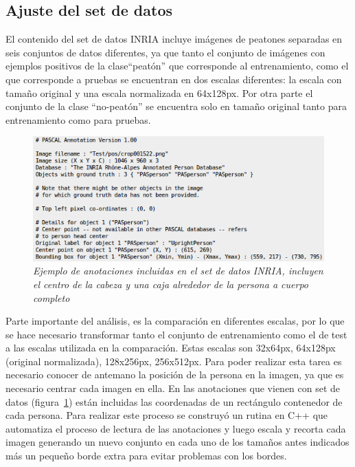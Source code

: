 \subsection{Ajuste del set de datos}

El contenido del set de datos INRIA incluye imágenes de peatones separadas en seis conjuntos de datos diferentes, ya que tanto el conjunto de imágenes con ejemplos positivos de la clase``peatón'' que corresponde al entrenamiento, como el que corresponde a pruebas se encuentran en dos escalas diferentes: la escala con tamaño original y una escala normalizada en 64x128px. Por otra parte el conjunto de la clase ``no-peatón'' se encuentra solo en tamaño original tanto para entrenamiento como para pruebas. 

\begin{figure}[H]
  \centering
  \includegraphics[scale=.6]{images/ejanotacion}
  \caption{\em Ejemplo de anotaciones incluidas en el set de datos INRIA, incluyen el centro de la cabeza y una caja alrededor de la persona a cuerpo completo }  
  \label{fig:ejanotacion}
\end{figure}

Parte importante del análisis, es la comparación en diferentes escalas, por lo que se hace necesario transformar tanto el conjunto de entrenamiento como el de test a las escalas utilizada en la comparación. Estas escalas son 32x64px, 64x128px (original normalizada), 128x256px, 256x512px. Para poder realizar esta tarea es necesario conocer de antemano la posición de la persona en la imagen, ya que es necesario centrar cada imagen en ella. En las anotaciones que vienen con set de datos (figura~\ref{fig:ejanotacion}) están incluidas las coordenadas de un rectángulo contenedor de cada persona. Para realizar este proceso se construyó un rutina en C++ que automatiza el proceso de lectura de las anotaciones y luego escala y recorta cada imagen generando un nuevo conjunto en cada uno de los tamaños antes indicados más un pequeño borde extra para evitar problemas con los bordes.

